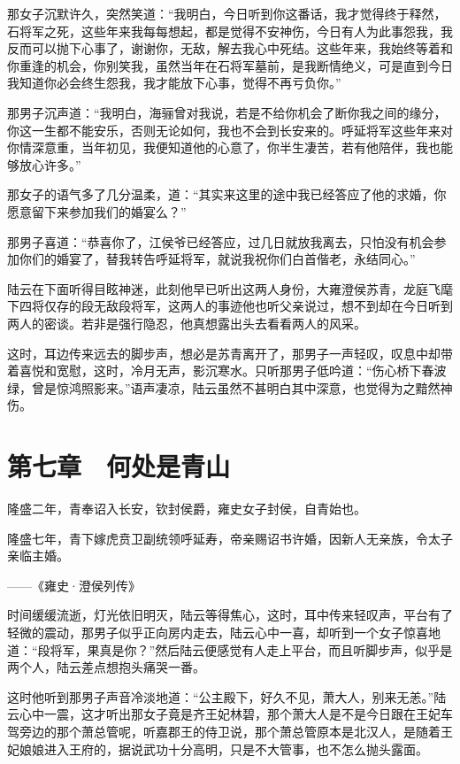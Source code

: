 那女子沉默许久，突然笑道：“我明白，今日听到你这番话，我才觉得终于释然，石将军之死，这些年来我每每想起，都是觉得不安神伤，今日有人为此事怨我，我反而可以抛下心事了，谢谢你，无敌，解去我心中死结。这些年来，我始终等着和你重逢的机会，你别笑我，虽然当年在石将军墓前，是我断情绝义，可是直到今日我知道你必会终生怨我，我才能放下心事，觉得不再亏负你。”

那男子沉声道：“我明白，海骊曾对我说，若是不给你机会了断你我之间的缘分，你这一生都不能安乐，否则无论如何，我也不会到长安来的。呼延将军这些年来对你情深意重，当年初见，我便知道他的心意了，你半生凄苦，若有他陪伴，我也能够放心许多。”

那女子的语气多了几分温柔，道：“其实来这里的途中我已经答应了他的求婚，你愿意留下来参加我们的婚宴么？”

那男子喜道：“恭喜你了，江侯爷已经答应，过几日就放我离去，只怕没有机会参加你们的婚宴了，替我转告呼延将军，就说我祝你们白首偕老，永结同心。”

陆云在下面听得目眩神迷，此刻他早已听出这两人身份，大雍澄侯苏青，龙庭飞麾下四将仅存的段无敌段将军，这两人的事迹他也听父亲说过，想不到却在今日听到两人的密谈。若非是强行隐忍，他真想露出头去看看两人的风采。

这时，耳边传来远去的脚步声，想必是苏青离开了，那男子一声轻叹，叹息中却带着喜悦和宽慰，这时，冷月无声，影沉寒水。只听那男子低吟道：“伤心桥下春波绿，曾是惊鸿照影来。”语声凄凉，陆云虽然不甚明白其中深意，也觉得为之黯然神伤。

\chapter{第七章　何处是青山}

隆盛二年，青奉诏入长安，钦封侯爵，雍史女子封侯，自青始也。

隆盛七年，青下嫁虎贲卫副统领呼延寿，帝亲赐诏书许婚，因新人无亲族，令太子亲临主婚。

——《雍史·澄侯列传》

时间缓缓流逝，灯光依旧明灭，陆云等得焦心，这时，耳中传来轻叹声，平台有了轻微的震动，那男子似乎正向房内走去，陆云心中一喜，却听到一个女子惊喜地道：“段将军，果真是你？”然后陆云便感觉有人走上平台，而且听脚步声，似乎是两个人，陆云差点想抱头痛哭一番。

这时他听到那男子声音冷淡地道：“公主殿下，好久不见，萧大人，别来无恙。”陆云心中一震，这才听出那女子竟是齐王妃林碧，那个萧大人是不是今日跟在王妃车驾旁边的那个萧总管呢，听嘉郡王的侍卫说，那个萧总管原本是北汉人，是随着王妃娘娘进入王府的，据说武功十分高明，只是不大管事，也不怎么抛头露面。

